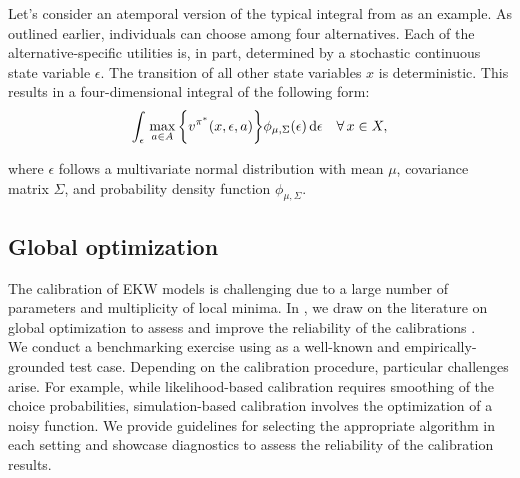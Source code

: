 \noindent Let's consider an atemporal version of the typical integral from \citet{Keane.1994} as an example. As outlined earlier, individuals can choose among four alternatives. Each of the alternative-specific utilities is, in part, determined by a stochastic continuous state variable $\epsilon$. The transition of all other state variables $x$ is deterministic. This results in a four-dimensional integral of the following form:
%
\begin{align*}
   \int_{\epsilon}\, \max_{a\in A} \bigg\{v^{\pi^*}(x, \epsilon, a)\bigg\} \phi_{\mu, \Sigma}(\epsilon) \mathop{}\!\mathrm{d}\epsilon \quad\forall\, x \in X,
\end{align*}

\noindent where $\epsilon$ follows a multivariate normal distribution with mean $\mu$, covariance matrix $ \Sigma$, and probability density function $\phi_{\mu, \Sigma}$.
\subsection{Global optimization}
The calibration of EKW models is challenging due to a large number of parameters and multiplicity of local minima. In \citet{Eisenhauer.2020b}, we draw on the literature on global optimization to assess and improve the reliability of the calibrations \citep{Locatelli.2013, Nocedal.2006}.\\

\noindent We conduct a benchmarking exercise using \citet{Keane.1994, Keane.1997} as a well-known and empirically-grounded test case. Depending on the calibration procedure, particular challenges arise. For example, while likelihood-based calibration requires smoothing of the choice probabilities, simulation-based calibration involves the optimization of a noisy function. We provide guidelines for selecting the appropriate algorithm in each setting and showcase diagnostics to assess the reliability of the calibration results.
